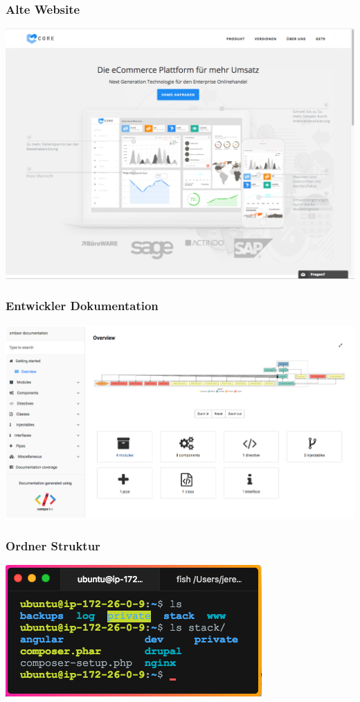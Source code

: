 \documentclass[11pt,a4paper]{article}
\begin{document}
\begin{appendices}
\subsubsection{Alte Website}
\includegraphics[scale=0.3]{getcore}
\subsubsection{Entwickler Dokumentation}
\label{sec:doku}
\includegraphics[scale=0.3]{compodoc}
\subsubsection{Ordner Struktur}
\label{sec:ordner}
\includegraphics[scale=0.8]{Terminal}

\end{appendices}
\end{document}
